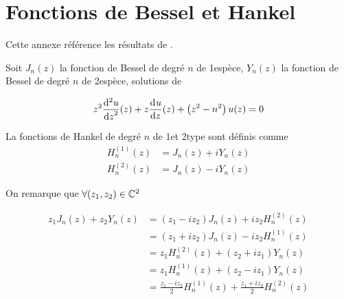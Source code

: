 \section{Fonctions de Bessel et Hankel}

Cette annexe référence les résultats de \cite{abramowitz_handbook_1964}.

Soit \(J_n(z)\) la fonction de Bessel de degré \(n\) de 1\iere espèce, \(Y_n(z)\) la fonction de Bessel de degré \(n\) de 2\ieme espèce, solutions de

\begin{equation}
    z^2 \ddp[2]{z}{u}(z) + z\ddp{z}{u}(z)+\left(z^2-n^2\right)u(z) = 0
\end{equation}

La fonctions de Hankel de degré \(n\) de 1\iere et 2\ieme type sont définis comme
\begin{align}
    H_n^{(1)}(z) &= J_n(z) + iY_n(z)\\
    H_n^{(2)}(z) &= J_n(z) - iY_n(z)
\end{align}

On remarque que \(\forall (z_1,z_2) \in \CC^2\)

\begin{equation}
\begin{aligned}
z_1 J_n(z) + z_2 Y_n(z) 
&= ( z_1 - i z_2 ) J_n(z) + iz_2 H_n^{(2)}(z) \\
&= ( z_1 + i z_2 ) J_n(z) - iz_2 H_n^{(1)}(z) \\
&= z_1 H_n^{(2)}(z) + ( z_2 + i z_1 ) Y_n(z) \\
&= z_1 H_n^{(1)}(z) + ( z_2 - i z_1 ) Y_n(z) \\
&= \frac{z_1-iz_2}{2}H_n^{(1)}(z) + \frac{z_1+iz_2}{2}H_n^{(2)}(z)
\end{aligned}
\label{eq:annex:bessel:equiv_bessel}
\end{equation}